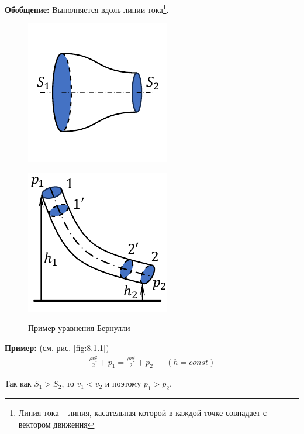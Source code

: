 \textbf{Обобщение:} Выполняется вдоль линии тока\footnote{Линия тока -- линия, касательная которой в каждой точке совпадает с вектором движения}.
\begin{figure}[h]
	\centering
	\begin{minipage}{0.49\linewidth}
		\centering
		\includegraphics[width=0.7\linewidth]{image/Уравнение Бернули 2.pdf}
		\subcaption{ }
		\label{fig:8.1.1}
	\end{minipage}
	\hfill
	\begin{minipage}{0.49\linewidth}
		\centering
		\includegraphics[width=0.7\linewidth]{image/Уравнение Бернули.pdf}
		\subcaption{ }
		\label{fig:8.1.2}
	\end{minipage}
	\caption{Пример уравнения Бернулли}
	\label{fig:bernoulli}
\end{figure}

\textbf{Пример:} (см. рис. \ref{fig:8.1.1})
\[\begin{aligned}
	\frac{\rho v_1^2}{2} + p_1 = \frac{\rho v_2^2}{2} + p_2 && (h = const)
\end{aligned}\]

Так как $S_1 > S_2$, то $v_1 < v_2$ и поэтому $p_1 > p_2$.